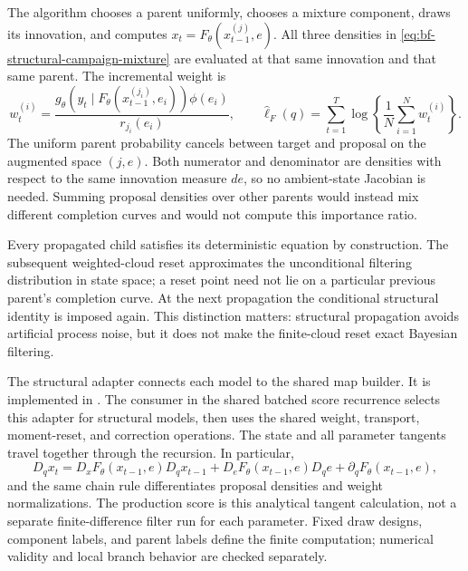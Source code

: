 The algorithm chooses a parent uniformly, chooses a mixture component, draws
its innovation, and computes $x_t=F_\theta(x_{t-1}^{(j)},e)$.
All three densities in \eqref{eq:bf-structural-campaign-mixture} are evaluated
at that same innovation and that same parent.  The incremental weight is
\begin{equation}
 w_t^{(i)}=
 \frac{g_\theta(y_t\mid F_\theta(x_{t-1}^{(j_i)},e_i))\phi(e_i)}
      {r_{j_i}(e_i)},
 \qquad
 \widehat\ell_F(q)=\sum_{t=1}^T
       \log\!\left\{\frac1N\sum_{i=1}^N w_t^{(i)}\right\}.
 \label{eq:bf-structural-campaign-weights}
\end{equation}
The uniform parent probability cancels between target and proposal on the
augmented space $(j,e)$.  Both numerator and denominator are densities with
respect to the same innovation measure $de$, so no ambient-state Jacobian is
needed.  Summing proposal densities over other parents would instead mix
different completion curves and would not compute this importance ratio.

Every propagated child satisfies its deterministic equation by construction.
The subsequent weighted-cloud reset approximates the unconditional filtering
distribution in state space; a reset point need not lie on a particular
previous parent's completion curve.  At the next propagation the conditional
structural identity is imposed again.  This distinction matters: structural
propagation avoids artificial process noise, but it does not make the
finite-cloud reset exact Bayesian filtering.

The structural adapter connects each model to the shared map builder.
It is implemented in .
The consumer in the shared
batched score recurrence selects this adapter for structural models, then
uses the shared weight, transport, moment-reset, and correction operations.
The state and all parameter tangents travel together through the recursion.
In particular,
\[
 D_qx_t=D_xF_\theta(x_{t-1},e)D_qx_{t-1}
          +D_eF_\theta(x_{t-1},e)D_qe
          +\partial_qF_\theta(x_{t-1},e),
\]
and the same chain rule differentiates proposal densities and weight
normalizations.  The production score is this analytical tangent calculation,
not a separate finite-difference filter run for each parameter.  Fixed draw
designs, component labels, and parent labels define the finite computation;
numerical validity and local branch behavior are checked separately.

